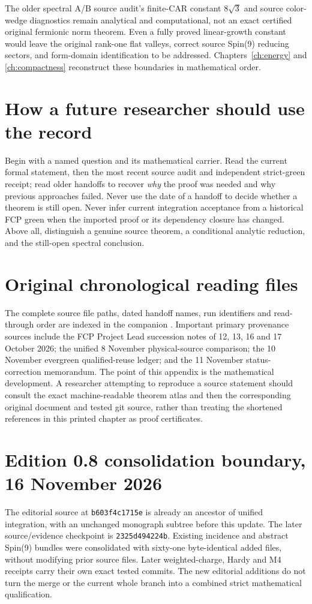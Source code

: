 The older spectral A/B source audit's finite-CAR constant $8\sqrt3$ and
source color-wedge diagnostics remain analytical and computational,
not an exact certified original fermionic norm theorem. Even a fully
proved linear-growth constant would leave the original rank-one flat
valleys, correct source Spin(9) reducing sectors, and form-domain
identification to be addressed. Chapters~\ref{ch:energy} and
\ref{ch:compactness} reconstruct these boundaries in mathematical order.

\section{How a future researcher should use the record}
Begin with a named question and its mathematical carrier. Read the
current formal statement, then the most recent source audit and
independent strict-green receipt; read older handoffs to recover
\emph{why} the proof was needed and why previous approaches failed.
Never use the date of a handoff to decide whether a theorem is still
open. Never infer current integration acceptance from a historical
FCP green when the imported proof or its dependency closure has
changed. Above all, distinguish a genuine source theorem, a
conditional analytic reduction, and the still-open spectral conclusion.

\section{Original chronological reading files}
The complete source file paths, dated handoff names, run identifiers and
read-through order are indexed in the companion
. Important primary provenance sources include
the FCP Project Lead succession notes of 12, 13, 16 and 17 October 2026;
the unified 8 November physical-source comparison; the 10 November evergreen
qualified-reuse ledger; and the 11 November status-correction memorandum.
The point of this appendix is the mathematical development. A researcher
attempting to reproduce a source statement should consult the exact
machine-readable theorem atlas and then the corresponding original document
and tested git source, rather than treating the shortened references in
this printed chapter as proof certificates.

\section{Edition 0.8 consolidation boundary, 16 November 2026}
The editorial source at \texttt{b603f4c1715e} is already an ancestor
of unified integration, with an unchanged monograph subtree before
this update. The later source/evidence checkpoint is
\texttt{2325d494224b}. Existing incidence and abstract Spin(9)
bundles were consolidated with sixty-one byte-identical added files,
without modifying prior source files. Later weighted-charge,
Hardy and M4 receipts carry their own exact tested commits.
The new editorial additions do not turn the merge or the current
whole branch into a combined strict mathematical qualification.

